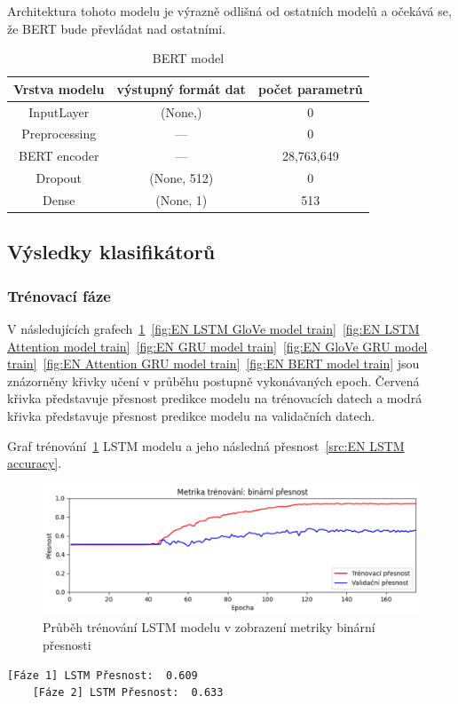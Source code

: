 Architektura tohoto modelu je výrazně odlišná od ostatních modelů a očekává se, že BERT bude převládat nad ostatními.

\begin{table}[H]
	\centering
	\caption{BERT model}\label{tab:BERT model}
	\begin{tabular}{ c c c }
			\toprule
			Vrstva modelu & výstupný formát dat & počet parametrů\\
			\midrule
            InputLayer & (None,) & 0\\         
            Preprocessing & --- & 0\\   
            BERT encoder & --- & 28,763,649\\    
            Dropout & (None, 512) & 0\\  
            Dense & (None, 1) & 513\\ 
			\midrule
		\end{tabular}
\end{table}

\subsection{Výsledky klasifikátorů}
\subsubsection{Trénovací fáze}
V následujících grafech~\ref{fig:EN LSTM model train}~\ref{fig:EN LSTM GloVe model train}~\ref{fig:EN LSTM Attention model train}~\ref{fig:EN GRU model train}~\ref{fig:EN GloVe GRU model train}~\ref{fig:EN Attention GRU model train}~\ref{fig:EN BERT model train} jsou znázorněny křivky učení v průběhu postupně vykonávaných epoch.
Červená křivka představuje přesnost predikce modelu na trénovacích datech a modrá křivka představuje přesnost predikce modelu na validačních datech.

Graf trénování~\ref{fig:EN LSTM model train} LSTM modelu a jeho následná přesnost~\ref{src:EN LSTM accuracy}.
\begin{figure}[H]
	\centering
	\includegraphics[width=1\textwidth]{Figures/EN_LSTM_binarni_presnost.png}
	\caption{Průběh trénování LSTM modelu v zobrazení metriky binární přesnosti}\label{fig:EN LSTM model train}
\end{figure}
\begin{lstlisting}[label=src:EN LSTM accuracy, caption={Výsledek LSTM modelu na anglickém datasetu po trénování~\ref{fig:EN LSTM model train}}]
	[Fáze 1] LSTM Přesnost:  0.609
	[Fáze 2] LSTM Přesnost:  0.633
\end{lstlisting}

